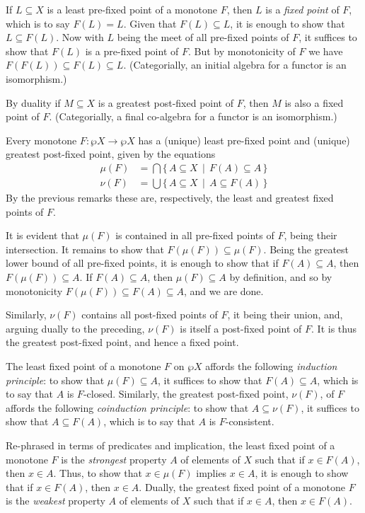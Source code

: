 \documentclass[11pt,twoside]{article}
\begin{document}
If $L\subseteq X$ is a least pre-fixed point of a monotone $F$, then $L$ is a \emph{fixed
point} of $F$, which is to say $F(L)=L$. Given that $F(L)\subseteq L$, it is enough to
show that $L\subseteq F(L)$. Now with $L$ being the meet of all pre-fixed points of $F$,
it suffices to show that $F(L)$ is a pre-fixed point of $F$. But by monotonicity of $F$ we
have $F(F(L))\subseteq F(L)\subseteq L$. (Categorially, an initial algebra for a functor
is an isomorphism.)

By duality if $M\subseteq X$ is a greatest post-fixed point of $F$, then $M$ is also a
fixed point of $F$. (Categorially, a final co-algebra for a functor is an isomorphism.)

Every monotone $F:\wp{X}\to\wp{X}$ has a (unique) least pre-fixed point and (unique)
greatest post-fixed point, given by the equations \begin{align*} \mu(F) & =
\bigcap\{\,A\subseteq X\,\mid\, F(A)\subseteq A\,\} \\ \nu(F) & = \bigcup\{\,A\subseteq
X\,\mid\,A\subseteq F(A)\,\} \end{align*} By the previous remarks these are, respectively,
the least and greatest fixed points of $F$.

It is evident that $\mu(F)$ is contained in all pre-fixed points of $F$, being their
intersection. It remains to show that $F(\mu(F))\subseteq \mu(F)$. Being the greatest
lower bound of all pre-fixed points, it is enough to show that if $F(A)\subseteq A$, then
$F(\mu(F))\subseteq A$. If $F(A)\subseteq A$, then $\mu(F)\subseteq A$ by definition, and
so by monotonicity $F(\mu(F))\subseteq F(A)\subseteq A$, and we are done.

Similarly, $\nu(F)$ contains all post-fixed points of $F$, it being their union, and,
arguing dually to the preceding, $\nu(F)$ is itself a post-fixed point of $F$. It is thus
the greatest post-fixed point, and hence a fixed point.

The least fixed point of a monotone $F$ on $\wp{X}$ affords the following \emph{induction
  principle}: to show that $\mu(F)\subseteq A$, it suffices to show that
$F(A)\subseteq A$, which is to say that $A$ is $F$-closed.  Similarly, the greatest post-fixed
point, $\nu(F)$, of $F$ affords the following \emph{coinduction principle}: to show that
$A\subseteq \nu(F)$, it suffices to show that $A\subseteq F(A)$, which is to say that $A$ is $F$-consistent.

Re-phrased in terms of predicates and implication, the least fixed point of a monotone $F$
is the \emph{strongest} property $A$ of elements of $X$ such that if $x\in F(A)$, then
$x\in A$. Thus, to show that $x\in\mu(F)$ implies $x\in A$, it is enough to show that if
$x\in F(A)$, then $x\in A$.  Dually, the greatest fixed point of a monotone $F$ is the
\emph{weakest} property $A$ of elements of $X$ such that if $x\in A$, then $x\in F(A)$.
\end{document}

